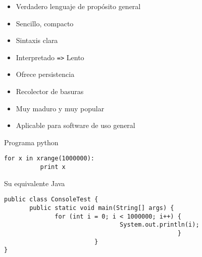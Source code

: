\documentclass[ucs]{beamer}
\begin{document}
\begin{frame}[fragile]
  \begin{itemize}
  \item Verdadero lenguaje de propósito general 
  \item Sencillo, compacto 
  \item Sintaxis clara
  \item Interpretado \verb|=>| Lento
  \item Ofrece persistencia
  \item Recolector de basuras
  \item Muy maduro y muy popular
  \item Aplicable para software de uso general
\end{itemize}
\end{frame}


\begin{frame}[fragile]
Programa python
\begin{verbatim}
for x in xrange(1000000):
          print x
\end{verbatim}
Su equivalente Java
\begin{verbatim}
public class ConsoleTest {
       public static void main(String[] args) {
              for (int i = 0; i < 1000000; i++) {
                                System.out.println(i);
                                                }
                         }
}
\end{verbatim}
\end{frame}




\end{document}

